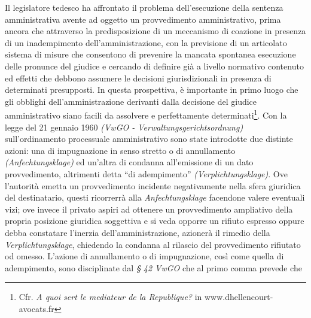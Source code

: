 \documentclass[12pt,it,a4paper,]{report}
\begin{document}
Il legislatore tedesco ha affrontato il problema dell'esecuzione della
sentenza amministrativa avente ad oggetto un provvedimento
amministrativo, prima ancora che attraverso la predisposizione di un
meccanismo di coazione in presenza di un inadempimento
dell'amministrazione, con la previsione di un articolato sistema di
misure che consentono di prevenire la mancata spontanea esecuzione delle
pronunce del giudice e cercando di definire già a livello normativo
contenuto ed effetti che debbono assumere le decisioni giurisdizionali
in presenza di determinati presupposti. In questa prospettiva, è
importante in primo luogo che gli obblighi dell'amministrazione
derivanti dalla decisione del giudice amministrativo siano facili da
assolvere e perfettamente determinati\footnote{Cfr. \emph{A quoi sert le
  mediateur de la Republique?} in www.dhellencourt-avocats.fr}. Con la
legge del 21 gennaio 1960 \emph{(VwGO - Verwaltungsgerichtsordnung)}
sull'ordinamento processuale amministrativo sono state introdotte due
distinte azioni: una di impugnazione in senso stretto o di annullamento
\emph{(Anfechtungsklage)} ed un'altra di condanna all'emissione di un
dato provvedimento, altrimenti detta ``di adempimento''
\emph{(Verplichtungsklage)}. Ove l'autorità emetta un provvedimento
incidente negativamente nella sfera giuridica del destinatario, questi
ricorrerrà alla \emph{Anfechtungsklage} facendone valere eventuali vizi;
ove invece il privato aspiri ad ottenere un provvedimento ampliativo
della propria posizione giuridica soggettiva e si veda opporre un
rifiuto espresso oppure debba constatare l'inerzia dell'amministrazione,
azionerà il rimedio della \emph{Verplichtungsklage}, chiedendo la
condanna al rilascio del provvedimento rifiutato od omesso. L'azione di
annullamento o di impugnazione, così come quella di adempimento, sono
disciplinate dal \emph{§ 42 VwGO} che al primo comma prevede che
\end{document}
